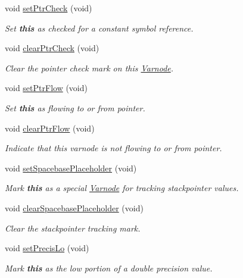 \begin{DoxyCompactItemize}
void \mbox{\hyperlink{class_varnode_a5e156fe05fb86c5efda500797872692b}{set\+Ptr\+Check}} (void)
\begin{DoxyCompactList}\small\item\em Set {\bfseries{this}} as checked for a constant symbol reference. \end{DoxyCompactList}\item 
void \mbox{\hyperlink{class_varnode_a2a4392f973d2f0dc1fb79d4bc6f3a37d}{clear\+Ptr\+Check}} (void)
\begin{DoxyCompactList}\small\item\em Clear the pointer check mark on this \mbox{\hyperlink{class_varnode}{Varnode}}. \end{DoxyCompactList}\item 
void \mbox{\hyperlink{class_varnode_a94142543eb3ac9cbf132e77c564ec04a}{set\+Ptr\+Flow}} (void)
\begin{DoxyCompactList}\small\item\em Set {\bfseries{this}} as flowing to or from pointer. \end{DoxyCompactList}\item 
void \mbox{\hyperlink{class_varnode_a72d8cb796a18e58c81280445e29c300b}{clear\+Ptr\+Flow}} (void)
\begin{DoxyCompactList}\small\item\em Indicate that this varnode is not flowing to or from pointer. \end{DoxyCompactList}\item 
void \mbox{\hyperlink{class_varnode_a10d47d335479abe27b8ae75b35f26b02}{set\+Spacebase\+Placeholder}} (void)
\begin{DoxyCompactList}\small\item\em Mark {\bfseries{this}} as a special \mbox{\hyperlink{class_varnode}{Varnode}} for tracking stackpointer values. \end{DoxyCompactList}\item 
void \mbox{\hyperlink{class_varnode_a8aa3f1ceca4a8406fadce9915c31254f}{clear\+Spacebase\+Placeholder}} (void)
\begin{DoxyCompactList}\small\item\em Clear the stackpointer tracking mark. \end{DoxyCompactList}\item 
void \mbox{\hyperlink{class_varnode_a62d871a96ac123caa3b851738cf49760}{set\+Precis\+Lo}} (void)
\begin{DoxyCompactList}\small\item\em Mark {\bfseries{this}} as the low portion of a double precision value. \end{DoxyCompactList}\item 

\end{DoxyCompactItemize}
